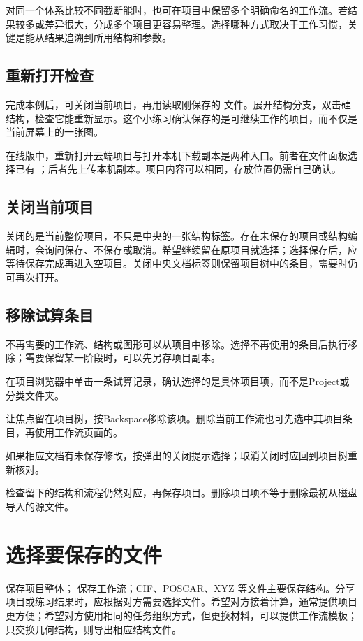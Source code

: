 对同一个体系比较不同截断能时，也可在项目中保留多个明确命名的工作流。若结果较多或差异很大，分成多个项目更容易整理。选择哪种方式取决于工作习惯，关键是能从结果追溯到所用结构和参数。

\subsection{重新打开检查}
完成本例后，可关闭当前项目，再用读取刚保存的  文件。展开结构分支，双击硅结构，检查它能重新显示。这个小练习确认保存的是可继续工作的项目，而不仅是当前屏幕上的一张图。

在线版中，重新打开云端项目与打开本机下载副本是两种入口。前者在文件面板选择已有 ；后者先上传本机副本。项目内容可以相同，存放位置仍需自己确认。

\subsection{关闭当前项目}

关闭的是当前整份项目，不只是中央的一张结构标签。存在未保存的项目或结构编辑时，会询问保存、不保存或取消。希望继续留在原项目就选择；选择保存后，应等待保存完成再进入空项目。关闭中央文档标签则保留项目树中的条目，需要时仍可再次打开。

\subsection{移除试算条目}

不再需要的工作流、结构或图形可以从项目中移除。选择不再使用的条目后执行移除；需要保留某一阶段时，可以先另存项目副本。

\begin{steps}
\item 在项目浏览器中单击一条试算记录，确认选择的是具体项目项，而不是Project或分类文件夹。
\item 让焦点留在项目树，按Backspace移除该项。删除当前工作流也可先选中其项目条目，再使用工作流页面的。
\item 如果相应文档有未保存修改，按弹出的关闭提示选择；取消关闭时应回到项目树重新核对。
\item 检查留下的结构和流程仍然对应，再保存项目。删除项目项不等于删除最初从磁盘导入的源文件。
\end{steps}


\section{选择要保存的文件}
 保存项目整体； 保存工作流；CIF、POSCAR、XYZ 等文件主要保存结构。分享项目或练习结果时，应根据对方需要选择文件。希望对方接着计算，通常提供项目更方便；希望对方使用相同的任务组织方式，但更换材料，可以提供工作流模板；只交换几何结构，则导出相应结构文件。

